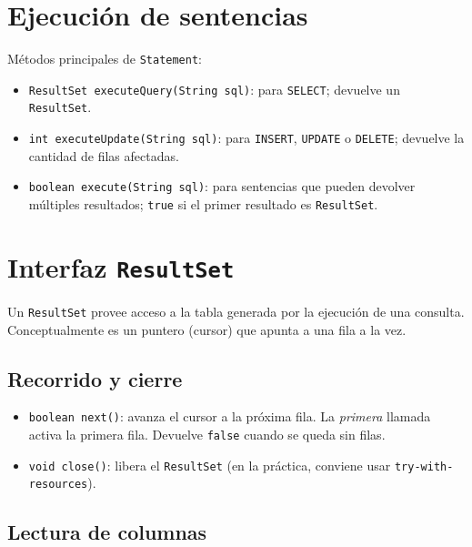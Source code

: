 \documentclass[11pt,a4paper]{article}
\begin{document}
\section{Ejecución de sentencias}

Métodos principales de \texttt{Statement}:

\begin{itemize}
    \item \texttt{ResultSet executeQuery(String sql)}: para
    \texttt{SELECT}; devuelve un \texttt{ResultSet}.
    \item \texttt{int executeUpdate(String sql)}: para
    \texttt{INSERT}, \texttt{UPDATE} o \texttt{DELETE}; devuelve la
    cantidad de filas afectadas.
    \item \texttt{boolean execute(String sql)}: para sentencias que
    pueden devolver múltiples resultados; \texttt{true} si el primer
    resultado es \texttt{ResultSet}.
\end{itemize}

\section{Interfaz \texttt{ResultSet}}

Un \texttt{ResultSet} provee acceso a la tabla generada por la
ejecución de una consulta. Conceptualmente es un puntero (cursor)
que apunta a una fila a la vez.

\subsection*{Recorrido y cierre}

\begin{itemize}
    \item \texttt{boolean next()}: avanza el cursor a la próxima
    fila. La \emph{primera} llamada activa la primera fila. Devuelve
    \texttt{false} cuando se queda sin filas.
    \item \texttt{void close()}: libera el \texttt{ResultSet} (en la
    práctica, conviene usar \texttt{try-with-resources}).
\end{itemize}

\subsection*{Lectura de columnas}
\end{document}
